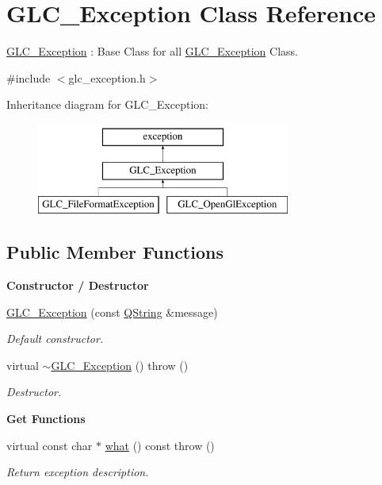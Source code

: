 \hypertarget{class_g_l_c___exception}{\section{G\-L\-C\-\_\-\-Exception Class Reference}
\label{class_g_l_c___exception}
}


\hyperlink{class_g_l_c___exception}{G\-L\-C\-\_\-\-Exception} \-: Base Class for all \hyperlink{class_g_l_c___exception}{G\-L\-C\-\_\-\-Exception} Class.  




{\ttfamily \#include $<$glc\-\_\-exception.\-h$>$}

Inheritance diagram for G\-L\-C\-\_\-\-Exception\-:\begin{figure}[H]
\begin{center}
\leavevmode
\includegraphics[height=3.000000cm]{class_g_l_c___exception}
\end{center}
\end{figure}
\subsection*{Public Member Functions}
\begin{Indent}{\bf Constructor / Destructor}\par
\begin{DoxyCompactItemize}
\item 
\hyperlink{class_g_l_c___exception_a213595bdb59ad4c58e8a1f51c7d0881a}{G\-L\-C\-\_\-\-Exception} (const \hyperlink{group___u_a_v_objects_plugin_gab9d252f49c333c94a72f97ce3105a32d}{Q\-String} \&message)
\begin{DoxyCompactList}\small\item\em Default constructor. \end{DoxyCompactList}\item 
virtual \hyperlink{class_g_l_c___exception_a7df5a8d4d6898d227e60db63b880e15e}{$\sim$\-G\-L\-C\-\_\-\-Exception} ()  throw ()
\begin{DoxyCompactList}\small\item\em Destructor. \end{DoxyCompactList}\end{DoxyCompactItemize}
\end{Indent}
\begin{Indent}{\bf Get Functions}\par
\begin{DoxyCompactItemize}
\item 
virtual const char $\ast$ \hyperlink{class_g_l_c___exception_ab4340b39a9868b5e612ef9b54cdca00c}{what} () const   throw ()
\begin{DoxyCompactList}\small\item\em Return exception description. \end{DoxyCompactList}\end{DoxyCompactItemize}
\end{Indent}

